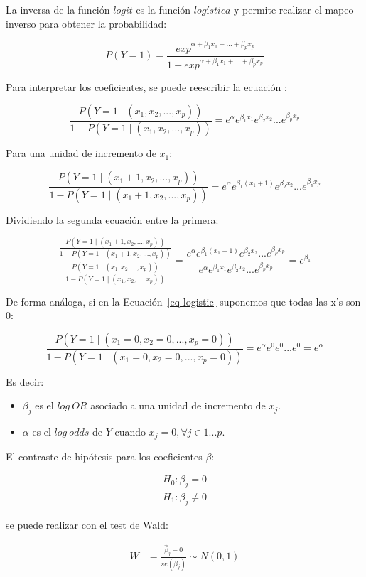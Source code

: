 \documentclass[
  12pt,
  a4paper,
  extrafontsizes,
  onecolumn,
  openright,
  table]{memoir}
\providecommand{\tightlist}{%
  \setlength{\itemsep}{0pt}\setlength{\parskip}{0pt}}\usepackage{longtable,booktabs,array}
\begin{document}
La inversa de la función \(logit\) es la función \(logística\) y permite
realizar el mapeo inverso para obtener la probabilidad:

\[
P(Y=1) = \frac{exp^{\alpha+\beta_1x_1+...+\beta_px_p}}{1 + exp^{\alpha+\beta_1x_1+...+\beta_px_p}}
\]

Para interpretar los coeficientes, se puede reescribir la ecuación
\autocite[ver][p.~260]{frienly2015}:

\[
\frac{P(Y=1 \mid (x_1,x_2,...,x_p))}{1-P(Y=1 \mid (x_1,x_2,...,x_p))} = e^{\alpha}e^{\beta_1x_1}e^{\beta_2x_2}...e^{\beta_px_p}
\]

Para una unidad de incremento de \(x_1\):

\[
\frac{P(Y=1 \mid (x_1+1,x_2,...,x_p))}{1-P(Y=1 \mid (x_1+1,x_2,...,x_p))} = e^{\alpha}e^{\beta_1(x_1+1)}e^{\beta_2x_2}...e^{\beta_px_p}
\]

Dividiendo la segunda ecuación entre la primera:

\[
\frac{\frac{P(Y=1 \mid (x_1+1,x_2,...,x_p))}{1-P(Y=1 \mid (x_1+1,x_2,...,x_p))}}{\frac{P(Y=1 \mid (x_1,x_2,...,x_p))}{1-P(Y=1 \mid (x_1,x_2,...,x_p))}} = \frac{e^{\alpha}e^{\beta_1(x_1+1)}e^{\beta_2x_2}...e^{\beta_px_p}}{e^{\alpha}e^{\beta_1x_1}e^{\beta_2x_2}...e^{\beta_px_p}} = e^{\beta_1}
\]

De forma análoga, si en la Ecuación~\ref{eq-logistic} suponemos que
todas las x's son 0:

\[
\frac{P(Y=1 \mid (x_1=0,x_2=0,...,x_p=0))}{1-P(Y=1 \mid (x_1=0,x_2=0,...,x_p=0))} = e^{\alpha}e^0e^0...e^0 = e^{\alpha}
\]

Es decir:

\begin{itemize}
\tightlist
\item
  \(\beta_j\) es el \(log\ OR\) asociado a una unidad de incremento de
  \(x_j\).
\item
  \(\alpha\) es el \(log\ odds\) de \(Y\) cuando
  \(x_j=0, \forall j \in 1...p\).
\end{itemize}

El contraste de hipótesis para los coeficientes \(\beta\):

\[
\begin{aligned}
H_0: \beta_j =  0 \\
H_1: \beta_j \ne  0
\end{aligned}
\]

se puede realizar con el test de Wald:

\[
\begin{aligned}
W & = \frac{\hat\beta_j - 0}{se(\hat\beta_j)} \sim N(0,1)
\end{aligned}
\]
\end{document}

